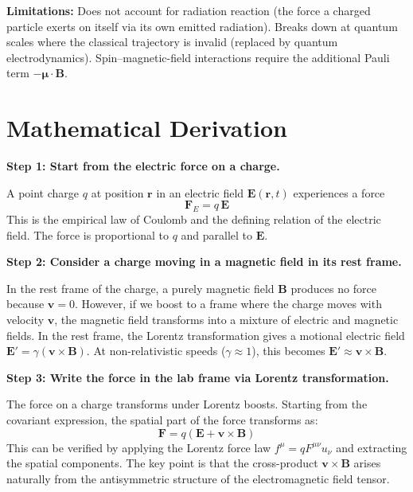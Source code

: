 \textbf{Limitations:} Does not account for radiation reaction (the force a charged particle exerts on itself via its own emitted radiation). Breaks down at quantum scales where the classical trajectory is invalid (replaced by quantum electrodynamics). Spin--magnetic-field interactions require the additional Pauli term $-\boldsymbol{\mu} \cdot \mathbf{B}$.


\section*{Mathematical Derivation}

\textbf{Step 1: Start from the electric force on a charge.}

A point charge $q$ at position $\mathbf{r}$ in an electric field $\mathbf{E}(\mathbf{r},t)$ experiences a force
\begin{equation}
\mathbf{F}_E = q\,\mathbf{E}
\end{equation}
This is the empirical law of Coulomb and the defining relation of the electric field. The force is proportional to $q$ and parallel to $\mathbf{E}$.

\textbf{Step 2: Consider a charge moving in a magnetic field in its rest frame.}

In the rest frame of the charge, a purely magnetic field $\mathbf{B}$ produces no force because $\mathbf{v} = 0$. However, if we boost to a frame where the charge moves with velocity $\mathbf{v}$, the magnetic field transforms into a mixture of electric and magnetic fields. In the rest frame, the Lorentz transformation gives a motional electric field $\mathbf{E}' = \gamma(\mathbf{v}\times\mathbf{B})$. At non-relativistic speeds ($\gamma \approx 1$), this becomes $\mathbf{E}' \approx \mathbf{v}\times\mathbf{B}$.

\textbf{Step 3: Write the force in the lab frame via Lorentz transformation.}

The force on a charge transforms under Lorentz boosts. Starting from the covariant expression, the spatial part of the force transforms as:
\begin{equation}
\mathbf{F} = q(\mathbf{E} + \mathbf{v}\times\mathbf{B})
\end{equation}
This can be verified by applying the Lorentz force law $f^\mu = qF^{\mu\nu}u_\nu$ and extracting the spatial components. The key point is that the cross-product $\mathbf{v}\times\mathbf{B}$ arises naturally from the antisymmetric structure of the electromagnetic field tensor.

